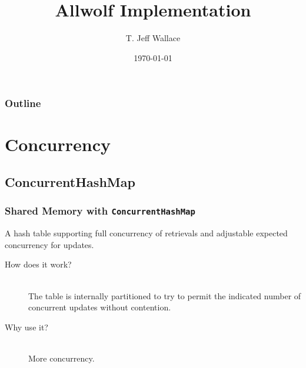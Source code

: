 \documentclass{beamer}
\title{Allwolf Implementation}
\author{T. Jeff Wallace}
\institute{McGill University}
\date{\today}
\begin{document}
\frame{\titlepage}

\section[Outline]{}
\begin{frame}
	\frametitle{Outline}
	\tableofcontents
\end{frame}

\section{Concurrency}

\subsection{ConcurrentHashMap}
\begin{frame}
	\frametitle{Shared Memory with {\tt ConcurrentHashMap}}
	\begin{definition}
	A hash table supporting full concurrency of retrievals and adjustable expected concurrency for updates.
	\end{definition}
	
	\begin{description}
		\item[How does it work?] \hfill \\
		The table is internally partitioned to try to permit the indicated number of concurrent updates without contention.
		\item[Why use it?] \hfill \\
		More concurrency.
	\end{description}
\end{frame}
\end{document}
